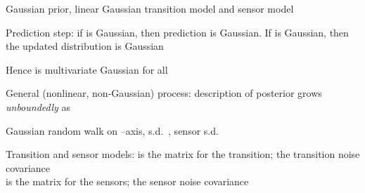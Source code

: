 \documentclass{article}
\begin{document}
\begin{huge}
\vspace{0.2in}

\textwidth
{}

Gaussian prior, linear Gaussian transition model and sensor model



Prediction step: if  is Gaussian, then prediction
\mat{\[
   \pv(\X_{t+1}|\e_{1:t}) =
  \int_{\sx_t}\pv(\X_{t+1}|\x_t)P(\x_t|\e_{1:t}) \,d\x_t
\]}
is Gaussian. If  is Gaussian, then the updated distribution
\mat{\[
  \pv(\X_{t+1}|\e_{1:t+1}) =
  \alpha \pv(\e_{t+1}|\X_{t+1}) \pv(\X_{t+1}|\e_{1:t})
\]}
is Gaussian

Hence  is multivariate Gaussian  for all 

General (nonlinear, non-Gaussian) process:
description of posterior grows \emph{unboundedly} as 




Gaussian random walk on --axis, s.d.~, sensor s.d.~
\mat{\[
\mu_{t+1} = \frac{(\sigma_t^2+\sigma_x^2)z_{t+1} + \sigma_z^2\mu_t}
                   {\sigma_t^2+\sigma_x^2+\sigma_z^2}
\qquad\qquad 
\sigma_{t+1}^2 = \frac{(\sigma_t^2+\sigma_x^2)\sigma_z^2}
                        {\sigma_t^2+\sigma_x^2+\sigma_z^2}
\]}

\vspace*{0.2in}

\textwidth
{}



Transition and sensor models:
\mat{\[
\begin{array}{rcl}
  P(\x_{t+1}|\x_t) & = & N(\kftm \x_t,\kftv)(\x_{t+1}) \\
  P(\z_t|\x_t) & = & N(\kfsm \x_t,\kfsv)(\z_t) 
\end{array}
\]}
\mat{$\kftm$} is the matrix for the transition; \mat{$\kftv$} the transition noise covariance\\
\mat{$\kfsm$} is the matrix for the sensors; \mat{$\kfsv$} the sensor noise covariance


\end{huge}
\end{document}
